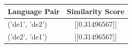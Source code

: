\begin{tabular}{|l|c|}
\hline
Language Pair & Similarity Score \\
\hline
('de1', 'de2') & [[0.31496567]] \\
('de2', 'de1') & [[0.31496567]] \\
\hline
\end{tabular}

